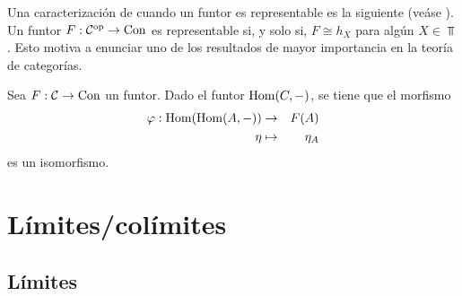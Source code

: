 Una caracterización de cuando un funtor es representable es la siguiente (veáse \cite{mac2013categories}). Un funtor $F:{\mathcal C}^{\mathrm{op}}\to{\mathrm{Con}}$ es representable si, y solo si,  $F\cong h_X$ para algún $X\in\Top$. Esto motiva a enunciar uno  de los resultados de mayor importancia en la teoría de categorías.
 \begin{lema} Sea $F:{\mathcal C}\to{\mathrm{Con}}$ un funtor. Dado el funtor $\operatorname{Hom}(C,-)$, se tiene que el morfismo
 \begin{eqnarray*}
     \varphi:\operatorname{Hom}(\operatorname{Hom}(A,-))&\to& F(A)\\
     \eta&\mapsto& \eta_A
 \end{eqnarray*}
es un isomorfismo.
 \end{lema}

\section{Límites/colímites}
\subsection{Límites}

